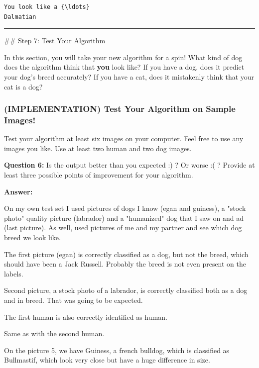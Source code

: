 \documentclass[11pt]{article}
\begin{document}
    \begin{Verbatim}[commandchars=\\\{\}]
You look like a {\ldots}
Dalmatian

    \end{Verbatim}

    \begin{center}\rule{0.5\linewidth}{\linethickness}\end{center}

 \#\# Step 7: Test Your Algorithm

In this section, you will take your new algorithm for a spin! What kind
of dog does the algorithm think that \textbf{you} look like? If you have
a dog, does it predict your dog's breed accurately? If you have a cat,
does it mistakenly think that your cat is a dog?

\subsubsection{(IMPLEMENTATION) Test Your Algorithm on Sample
Images!}\label{implementation-test-your-algorithm-on-sample-images}

Test your algorithm at least six images on your computer. Feel free to
use any images you like. Use at least two human and two dog images.

\textbf{Question 6:} Is the output better than you expected :) ? Or
worse :( ? Provide at least three possible points of improvement for
your algorithm.

\textbf{Answer:}

On my own test set I used pictures of dogs I know (egan and guiness), a
"stock photo" quality picture (labrador) and a "humanized" dog that I
saw on and ad (last picture). As well, used pictures of me and my
partner and see which dog breed we look like.

The first picture (egan) is correctly classified as a dog, but not the
breed, which should have been a Jack Russell. Probably the breed is not
even present on the labels.

Second picture, a stock photo of a labrador, is correctly classified
both as a dog and in breed. That was going to be expected.

The first human is also correctly identified as human.

Same as with the second human.

On the picture 5, we have Guiness, a french bulldog, which is classified
as Bullmastif, which look very close but have a huge difference in size.
\end{document}
